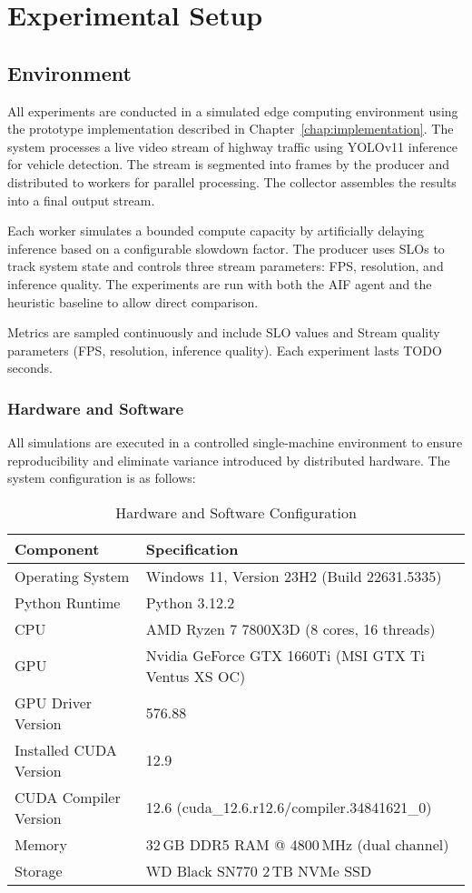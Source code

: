 \section{Experimental Setup}
\label{sec:evaluation-setup}

\subsection{Environment}
\label{sec:evaluation-environment}

All experiments are conducted in a simulated edge computing environment using the prototype implementation described in Chapter~\ref{chap:implementation}. The system processes a live video stream of highway traffic using YOLOv11 inference for vehicle detection. The stream is segmented into frames by the producer and distributed to workers for parallel processing. The collector assembles the results into a final output stream.

Each worker simulates a bounded compute capacity by artificially delaying inference based on a configurable slowdown factor. The producer uses SLOs to track system state and controls three stream parameters: FPS, resolution, and inference quality. The experiments are run with both the AIF agent and the heuristic baseline to allow direct comparison.

Metrics are sampled continuously and include SLO values and Stream quality parameters (FPS, resolution, inference quality). Each experiment lasts TODO seconds.

\subsubsection{Hardware and Software}
All simulations are executed in a controlled single-machine environment to ensure reproducibility and eliminate variance introduced by distributed hardware. The system configuration is as follows:

\begin{table}[H]
\centering
\caption{Hardware and Software Configuration}
\label{tab:hardware-software}
\begin{tabular}{@{}ll@{}}
\toprule
\textbf{Component} & \textbf{Specification} \\
\midrule
Operating System & Windows 11, Version 23H2 (Build 22631.5335) \\
Python Runtime & Python 3.12.2 \\
CPU & AMD Ryzen 7 7800X3D (8 cores, 16 threads) \\
GPU & Nvidia GeForce GTX 1660Ti (MSI GTX Ti Ventus XS OC) \\
GPU Driver Version & 576.88 \\
Installed CUDA Version & 12.9 \\
CUDA Compiler Version & 12.6 (cuda\_12.6.r12.6/compiler.34841621\_0) \\
Memory & 32\,GB DDR5 RAM @ 4800\,MHz (dual channel) \\
Storage & WD Black SN770 2\,TB NVMe SSD \\
\bottomrule
\end{tabular}
\end{table}



